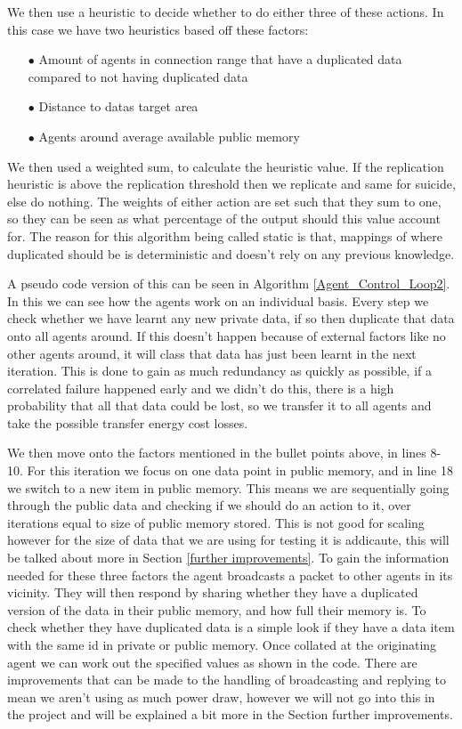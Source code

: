 \documentclass{UoYCSproject}
\begin{document}
We then use a heuristic to decide whether to do either three of these actions. 
In this case we have two heuristics based off these factors:

\begin{itemize} 
\itemsep-1em 
\item[$\bullet$] Amount of agents in connection range that have a duplicated data compared to not having duplicated data
\item[$\bullet$] Distance to datas target area
\item[$\bullet$] Agents around average available public memory
\end{itemize}

We then used a weighted sum, to calculate the heuristic value. 
If the replication heuristic is above the replication threshold then we replicate and same for suicide, else do nothing. 
The weights of either action are set such that they sum to one, so they can be seen as what percentage of the output should this value account for. 
The reason for this algorithm being called static is that, mappings of where duplicated should be is deterministic and doesn’t rely on any previous knowledge. 

A pseudo code version of this can be seen in Algorithm \ref{Agent_Control_Loop2}. 
In this we can see how the agents work on an individual basis. 
Every step we check whether we have learnt any new private data, if so then duplicate that data onto all agents around. 
If this doesn’t happen because of external factors like no other agents around, it will class that data has just been learnt in the next iteration. 
This is done to gain as much redundancy as quickly as possible, if a correlated failure happened early and we didn’t do this, there is a high probability that all that data could be lost, so we transfer it to all agents and take the possible transfer energy cost losses.

We then move onto the factors mentioned in the bullet points above, in lines 8-10. 
For this iteration we focus on one data point in public memory, and in line 18 we switch to a new item in public memory. 
This means we are sequentially going through the public data and checking if we should do an action to it, over iterations equal to size of public memory stored. 
This is not good for scaling however for the size of data that we are using for testing it is addicaute, this will be talked about more in Section \ref{further improvements}. 
To gain the information needed for these three factors the agent broadcasts a packet to other agents in its vicinity. 
They will then respond by sharing whether they have a duplicated version of the data in their public memory, and how full their memory is. 
To check whether they have duplicated data is a simple look if they have a data item with the same id in private or public memory. 
Once collated at the originating agent we can work out the specified values as shown in the code. 
There are improvements that can be made to the handling of broadcasting and replying to mean we aren’t using as much power draw, however we will not go into this in the project and will be explained a bit more in the Section {further improvements}.
\end{document}
